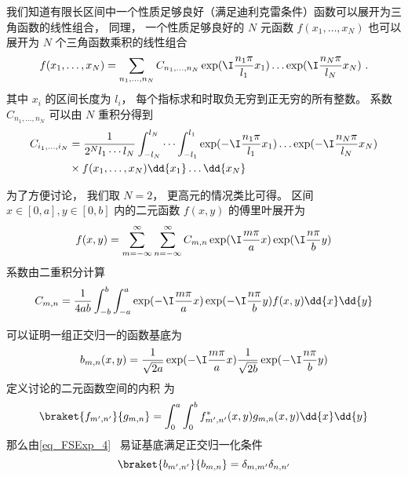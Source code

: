 

我们知道有限长区间中一个性质足够良好（满足迪利克雷条件）函数可以展开为三角函数的线性组合， 同理， 一个性质足够良好的 $N$ 元函数 $f(x_1, \dots, x_N)$ 也可以展开为 $N$ 个三角函数乘积的线性组合
\begin{equation}
f(x_1, \dots, x_N) = \sum_{n_1,\dots, n_N} C_{n_1,\dots, n_N} \exp(\I \frac{n_1\pi}{l_1} x_1) \dots \exp(\I \frac{n_N \pi}{l_N} x_N)~.
\end{equation}
其中 $x_i$ 的区间长度为 $l_i$， 每个指标求和时取负无穷到正无穷的所有整数。 系数 $C_{n_1,\dots, n_N}$ 可以由 $N$ 重积分得到
\begin{equation}
\begin{aligned}
C_{i_1,\dots, i_N} &= \frac{1}{2^Nl_1\cdots l_N}\int_{-l_N}^{l_N}\cdots\int_{-l_1}^{l_1} \exp(-\I \frac{n_1 \pi}{l_1} x_1) \dots \exp(-\I \frac{n_N \pi}{l_N} x_N)\\
 & \times f(x_1, \dots, x_N) \dd{x_1}\dots\dd{x_N}
\end{aligned}
\end{equation}

为了方便讨论， 我们取 $N = 2$， 更高元的情况类比可得。 区间 $x\in [0, a], y\in [0, b]$ 内的二元函数 $f(x, y)$ 的傅里叶展开为
\begin{equation}
f(x, y) = \sum_{m = -\infty}^\infty \sum_{n = -\infty}^\infty C_{m, n} \exp(\I \frac{m \pi}{a} x) \exp(\I \frac{n \pi}{b} y)
\end{equation}
系数由二重积分计算
\begin{equation}
C_{m, n} = \frac{1}{4ab}\int_{-b}^b\int_{-a}^a \exp(-\I \frac{m \pi}{a} x) \exp(-\I \frac{n \pi}{b} y) f(x, y) \dd{x} \dd{y}
\end{equation}

可以证明一组正交归一的函数基底为
\begin{equation}
b_{m,n}(x, y) = \frac{1}{\sqrt{2a}}\exp(-\I \frac{m \pi}{a} x) \frac{1}{\sqrt{2b}}\exp(-\I \frac{n \pi}{b} y)
\end{equation}
定义讨论的二元函数空间的内积 为
\begin{equation}
\braket{f_{m',n'}}{g_{m,n}} = \int_0^a\int_0^b f^*_{m',n'}(x, y) g_{m,n}(x, y) \dd{x}\dd{y}
\end{equation}
那么由\autoref{eq_FSExp_4}~ 易证基底满足正交归一化条件
\begin{equation}
\braket{b_{m',n'}}{b_{m,n}} = \delta_{m,m'} \delta_{n,n'}
\end{equation}

